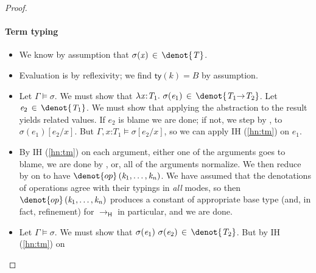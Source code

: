 \documentclass[9pt]{extarticle}
\newcommand{\ottnt}[1]{\mathit{#1}}
\newcommand{\ottmv}[1]{\mathit{#1}}
\newcommand{\ottsym}[1]{#1}
\begin{document}
{\begin{lemma}
\begin{proof}
{    \paragraph{Term typing \fbox{$ \Gamma   \vdash _{  \mathsf{H}  }  \ottnt{e}  :  \ottnt{T} $}}
    \begin{itemize}
    \item[\T{Var}] We know by assumption that $\sigma  \ottsym{(}  \mathit{x}  \ottsym{)} \, \in \,  \denot{ \ottnt{T} } $.
    \item[\T{Const}] Evaluation is by reflexivity; we find $ \mathsf{ty} ( \ottnt{k} )   \ottsym{=}  \ottnt{B}$ by assumption.
    \item[\T{Abs}] Let $\Gamma  \models  \sigma$. We must show that
      $ \lambda \mathit{x} \mathord{:} \ottnt{T_{{\mathrm{1}}}} .~  \sigma  \ottsym{(}  \ottnt{e_{{\mathrm{1}}}}  \ottsym{)}  \, \in \,  \denot{  \ottnt{T_{{\mathrm{1}}}} \mathord{ \rightarrow } \ottnt{T_{{\mathrm{2}}}}  } $. Let $\ottnt{e_{{\mathrm{2}}}} \, \in \,  \denot{ \ottnt{T_{{\mathrm{1}}}} } $. We
      must show that applying the abstraction to the result yields
      related values. If $\ottnt{e_{{\mathrm{2}}}}$ is blame we are done; if not, we
      step by , to $ \sigma  \ottsym{(}  \ottnt{e_{{\mathrm{1}}}}  \ottsym{)}  [  \ottnt{e_{{\mathrm{2}}}} / \mathit{x}  ] $. But $ \Gamma , \mathit{x} \mathord{:} \ottnt{T_{{\mathrm{1}}}}   \models   \sigma  [  \ottnt{e_{{\mathrm{2}}}} / \mathit{x}  ] $, so we can apply IH (\ref{hn:tm}) on $\ottnt{e_{{\mathrm{1}}}}$.
    \item[\T{Op}] By IH (\ref{hn:tm}) on each argument, either one
      of the arguments goes to blame, we are done by , or,
      all of the arguments normalize. We then reduce by  on to
      have $\denot{ op } \, \ottsym{(}  \ottnt{k_{{\mathrm{1}}}}  \ottsym{,}  \dots  \ottsym{,}  \ottnt{k_{\ottmv{n}}}  \ottsym{)}$. We have assumed that the
      denotations of operations agree with their typings in
      \textit{all} modes, so then $\denot{ op } \, \ottsym{(}  \ottnt{k_{{\mathrm{1}}}}  \ottsym{,}  \dots  \ottsym{,}  \ottnt{k_{\ottmv{n}}}  \ottsym{)}$ produces a
      constant of appropriate base type (and, in fact, refinement) for
      $ \longrightarrow _{  \mathsf{H}  } $ in particular, and we are done.
    \item[\T{App}] Let $\Gamma  \models  \sigma$. We must show that
      $ \sigma  \ottsym{(}  \ottnt{e_{{\mathrm{1}}}}  \ottsym{)} ~ \sigma  \ottsym{(}  \ottnt{e_{{\mathrm{2}}}}  \ottsym{)}  \, \in \,  \denot{ \ottnt{T_{{\mathrm{2}}}} } $. But by IH (\ref{hn:tm}) on

\end{itemize}}
\end{proof}
\end{lemma}}
\end{document}
